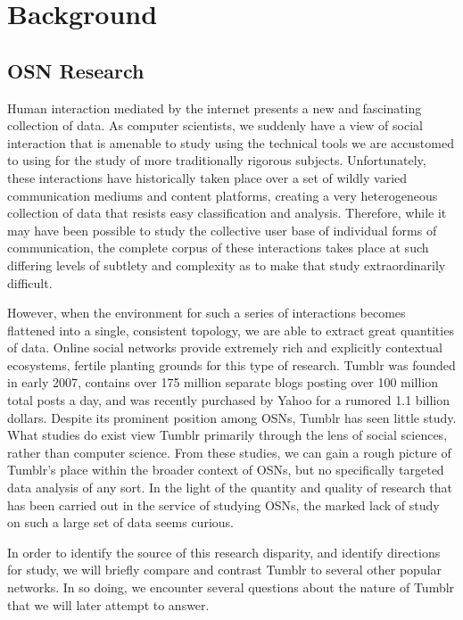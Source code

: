 \section{Background}
\label{sec:-back}
\subsection{OSN Research}


Human interaction mediated by the internet presents a new and fascinating 
collection of data\cite{werry1996internet}.  As computer scientists, 
we suddenly have a view of social interaction that is amenable to study 
using the technical tools we are accustomed to using for the study of 
more traditionally rigorous subjects.  Unfortunately, these interactions 
have historically taken place over a set of wildly varied communication 
mediums and content platforms, creating a very heterogeneous collection 
of data that resists easy classification and analysis.  Therefore, while 
it may have been possible to study the collective user base of individual 
forms of communication\cite{reid1991electropolis}, the complete corpus of 
these interactions takes place at such differing levels of subtlety and 
complexity as to make that study extraordinarily difficult.

However, when the environment for such a series of interactions becomes 
flattened into a single, consistent topology, we are able to extract 
great quantities of data.  Online social networks provide extremely 
rich and explicitly contextual ecosystems, fertile planting grounds for 
this type of research.  Tumblr was founded in early 2007, contains over 
175 million separate blogs posting over 100 million total posts a 
day\cite{tumblr:about}, and was recently purchased by Yahoo for a 
rumored 1.1 billion dollars\cite{bbc-business}.  Despite its prominent 
position among OSNs, Tumblr has seen little study.  What studies do 
exist view Tumblr primarily through the lens of social sciences, rather than 
computer science.  From these studies, we can gain a rough picture of 
Tumblr's place within the broader context of OSNs, but no specifically 
targeted data analysis of any sort.  In the light of the quantity and 
quality of research that has been carried out in the service of studying 
OSNs, the marked lack of study on such a large set of data seems curious.


In order to identify the source of this research disparity, and
identify directions for study, we will briefly compare and contrast 
Tumblr to several other popular networks.  In so doing, we encounter 
several questions about the nature of Tumblr that we will later 
attempt to answer.


